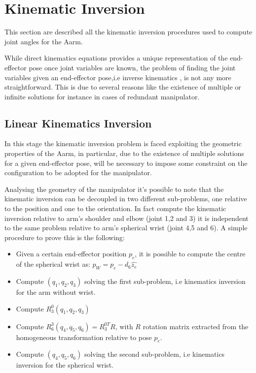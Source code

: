 \section{Kinematic Inversion}

This section are described all the kinematic inversion procedures used to compute joint angles for the Aarm.

While direct kinematics equations provides a unique representation of the end-effector pose once joint variables are known, the problem of finding the joint variables given an end-effector pose,i.e inverse kinematics , is not any more straightforward. This is due to several reasons like the existence of multiple or infinite solutions for instance in cases of redundant manipulator.

\subsection{Linear Kinematics Inversion}
\label{ssec:lik}
In this stage the kinematic inversion problem is faced exploiting the geometric properties of the Aarm, in particular, due to the existence of multiple solutions for a given end-effector pose, will be necessary to impose some constraint on the configuration to be adopted for the manipulator.

Analysing the geometry of the manipulator it's possible to note that the kinematic inversion can be decoupled in two different sub-problems, one relative to the position and one to the orientation. In fact compute the kinematic inversion relative to arm's shoulder and elbow (joint 1,2 and 3) it is independent to the same problem relative to arm's spherical wrist (joint 4,5 and 6). A simple procedure to prove this is the following:
\begin{itemize}
	\item Given a certain end-effector position $p_e$, it is possible to compute the centre of the spherical wrist as: $p_W = p_e - d_6\hat{z_e}$
	\item Compute $\left(q_1,q_2,q_3\right)$ solving the first sub-problem, i.e kinematics inversion for the arm without wrist.
	\item Compute $R^0_3(q_1,q_2,q_3)$
	\item Compute $R^3_6(q_4,q_5,q_6) = R^{0T}_3R$, with $R$ rotation matrix extracted from the homogeneous transformation relative to pose $p_e$.
	\item Compute $\left(q_4,q_5,q_6\right)$ solving the second sub-problem, i.e kinematics inversion for the spherical wrist.
\end{itemize}

